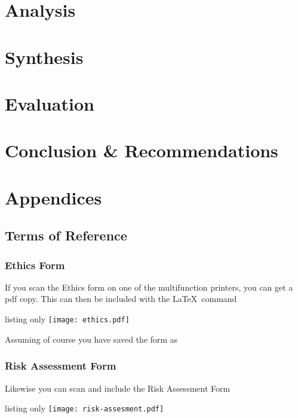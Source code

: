 \documentclass[12pt,twoside]{book}
\begin{document}
\frontmatter




\tableofcontents

\mainmatter


\part{Analysis}


\part{Synthesis}


\part{Evaluation}


\part{Conclusion \& Recommendations}






\part{Appendices}
\appendix

\chapter{Terms of Reference}

\section{Ethics Form}
If you scan the Ethics form on one of the multifunction printers, you can get a pdf copy.  This can then be included with the \LaTeX\ command
\begin{tcblisting}{listing only}
\texttt{[image: ethics.pdf]}
\end{tcblisting}
Assuming of course you have saved the form  as 

\section{Risk Assessment Form}
Likewise you can scan and include the Risk Assessment Form
\begin{tcblisting}{listing only}
\texttt{[image: risk-assesment.pdf]}
\end{tcblisting}
\end{document}
